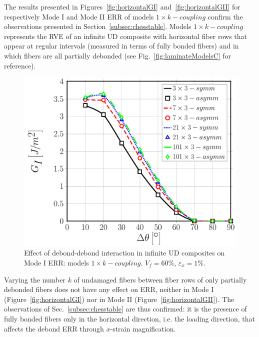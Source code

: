 \documentclass[smallextended]{svjour3}       %
\begin{document}
The results presented in Figures~\ref{fig:horizontalGI} and~\ref{fig:horizontalGII} for respectively Mode I and Mode II ERR of models $1\times k-coupling$ confirm the observations presented in Section~\ref{subsec:chesstable}. Models $1\times k-coupling$ represents the RVE of an infinite UD composite with horizontal fiber rows that appear at regular intervals (measured in terms of fully bonded fibers) and in which fibers are all partially debonded (see Fig.~\ref{fig:laminateModelsC} for reference).

\begin{figure}[!h]
\centering
\includegraphics[width=\textwidth]{nxk-coupling-vf60-GI.pdf}
\caption{Effect of debond-debond interaction in infinite UD composites on Mode I ERR: models $1\times k-coupling$. $V_{f}=60\%$, $\varepsilon_{x}=1\%$.}\label{fig:nxkGI}
\end{figure}

Varying the number $k$ of undamaged fibers between fiber rows of only partially debonded fibers does not have any effect on ERR, neither in Mode I (Figure~\ref{fig:horizontalGI}) nor in Mode II (Figure~\ref{fig:horizontalGII}). The observations of Sec.~\ref{subsec:chesstable} are thus confirmed: it is the presence of fully bonded fibers only in the horizontal direction, i.e. the loading direction, that affects the debond ERR through $x$-strain magnification.
\end{document}
